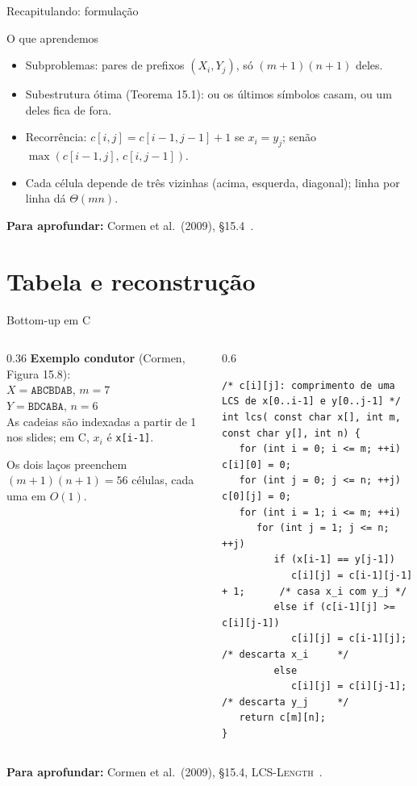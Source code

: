 \documentclass[aspectratio=169,xcolor=table]{beamer}
\newcommand{\fonte}[1]{%
  \vfill
  {\tiny\color{gray!55!black}\textbf{Para aprofundar:} #1\par}%
}
\begin{document}
\begin{frame}{Recapitulando: formulação}
  \begin{block}{O que aprendemos}
    \begin{itemize}\scriptsize
      \item Subproblemas: pares de prefixos $(X_i, Y_j)$, só $(m+1)(n+1)$ deles.
      \item Subestrutura ótima (Teorema 15.1): ou os últimos símbolos casam, ou um deles
            fica de fora.
      \item Recorrência: $c[i,j] = c[i-1,j-1]+1$ se $x_i = y_j$; senão
            $\max(c[i-1,j],\,c[i,j-1])$.
      \item Cada célula depende de três vizinhas (acima, esquerda, diagonal); linha por
            linha dá $\Theta(mn)$.
    \end{itemize}
  \end{block}
  \fonte{Cormen et al.\ (2009), \S 15.4~\cite{cormen2009introduction}.}
\end{frame}

\section{Tabela e reconstrução}

\begin{frame}[fragile]{Bottom-up em C}
  \begin{columns}[T]
    \begin{column}{0.36\textwidth}
      \scriptsize\textbf{Exemplo condutor} (Cormen, Figura 15.8):\\[3pt]
      $X = \texttt{ABCBDAB}$, $m = 7$\\
      $Y = \texttt{BDCABA}$, $n = 6$\\[4pt]
      As cadeias são indexadas a partir de 1 nos slides; em C, $x_i$ é \texttt{x[i-1]}.
      \medskip

      Os dois laços preenchem $(m+1)(n+1) = 56$ células, cada uma em $O(1)$.
    \end{column}
    \begin{column}{0.6\textwidth}
\begin{lstlisting}[basicstyle=\ttfamily\tiny]
/* c[i][j]: comprimento de uma LCS de x[0..i-1] e y[0..j-1] */
int lcs( const char x[], int m, const char y[], int n) {
   for (int i = 0; i <= m; ++i) c[i][0] = 0;
   for (int j = 0; j <= n; ++j) c[0][j] = 0;
   for (int i = 1; i <= m; ++i)
      for (int j = 1; j <= n; ++j)
         if (x[i-1] == y[j-1])
            c[i][j] = c[i-1][j-1] + 1;      /* casa x_i com y_j */
         else if (c[i-1][j] >= c[i][j-1])
            c[i][j] = c[i-1][j];            /* descarta x_i     */
         else
            c[i][j] = c[i][j-1];            /* descarta y_j     */
   return c[m][n];
}
\end{lstlisting}
    \end{column}
  \end{columns}
  \fonte{Cormen et al.\ (2009), \S 15.4, \textsc{LCS-Length}~\cite{cormen2009introduction}.}
\end{frame}
\end{document}
